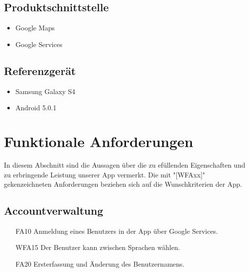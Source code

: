 \documentclass{scrartcl}
\begin{document}
	\subsection{Produktschnittstelle}
	\begin{itemize}	        
		\item Google Maps
		\item Google Services
	\end{itemize}
	\subsection{Referenzgerät}
	\begin{itemize}
		\item Samsung Galaxy S4
		\item Android 5.0.1
	\end{itemize}
	\newpage
	
	
	\section{Funktionale Anforderungen}
	 In diesem Abschnitt sind die Aussagen über die zu efüllenden Eigenschaften und zu erbringende Leistung unserer App vermerkt. Die mit "[WFAxx]" gekenzeichneten Anforderungen beziehen sich auf die Wunschkriterien der App.
	 
	\subsection{Accountverwaltung}
	\begin{itemize}
		\item[FA10] Anmeldung eines Benutzers in der App über Google Services.
		\item[WFA15] Der Benutzer kann zwischen Sprachen wählen.
		\item[FA20] Ersterfassung und Änderung des Benutzernamens.
		
	\end{itemize}
	
\end{document}
